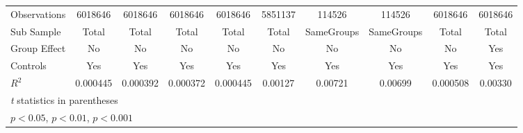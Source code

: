 {\begin{tabular}{l*{9}{c}}
\hline
Observations    &  6018646         &  6018646         &  6018646         &  6018646         &  5851137         &   114526         &   114526         &  6018646         &  6018646         \\
Sub Sample      &    Total         &    Total         &    Total         &    Total         &    Total         &SameGroups         &SameGroups         &    Total         &    Total         \\
Group Effect    &       No         &       No         &       No         &       No         &       No         &       No         &       No         &       No         &      Yes         \\
Controls        &      Yes         &      Yes         &      Yes         &      Yes         &      Yes         &      Yes         &      Yes         &      Yes         &      Yes         \\
$ R^2 $         & 0.000445         & 0.000392         & 0.000372         & 0.000445         &  0.00127         &  0.00721         &  0.00699         & 0.000508         &  0.00330         \\
\hline\hline
\multicolumn{10}{l}{\footnotesize \textit{t} statistics in parentheses}\\
\multicolumn{10}{l}{\footnotesize \sym{*} \(p<0.05\), \sym{**} \(p<0.01\), \sym{***} \(p<0.001\)}\\
\end{tabular}
}
